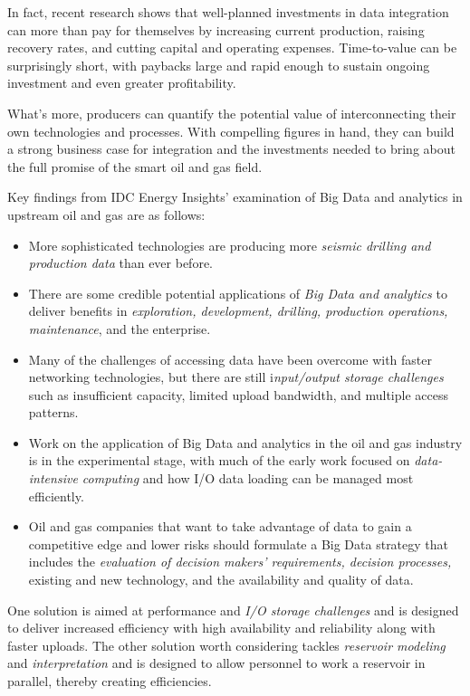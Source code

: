 \documentclass[twocolumn]{article}
\newcommand{\bi}{\begin{itemize}}
\newcommand{\ei}{\end{itemize}}
\newcommand{\ii}{\item}
\begin{document}
In fact, recent research shows that well-planned investments in data integration can more than pay for themselves by increasing current production, raising recovery rates, and cutting capital and operating expenses. Time-to-value can be surprisingly short, with paybacks large and rapid enough to sustain ongoing investment and even greater profitability.

What’s more, producers can quantify the potential value
of interconnecting their own technologies and processes. With compelling figures in hand, they can build a strong business case for integration and the investments needed to bring about the full promise of the smart oil and gas field.

Key findings from IDC Energy Insights' examination of Big Data and analytics in upstream oil and gas are as follows:
\bi
\ii More sophisticated technologies are producing more \emph{seismic drilling and production data} than ever before.
\ii There are some credible potential applications of \emph{Big Data and analytics }to deliver benefits in \emph{exploration, development, drilling, production operations, maintenance}, and the enterprise.
\ii Many of the challenges of accessing data have been overcome with faster networking technologies, but there are still i\emph{nput/output storage challenges} such as insufficient capacity, limited upload bandwidth, and multiple access patterns.
\ii Work on the application of Big Data and analytics in the oil and gas industry is in the experimental stage, with much of the early work focused on \emph{data-intensive computing} and how I/O data loading can be managed most efficiently.
\ii Oil and gas companies that want to take advantage of data to gain a competitive edge and lower risks should formulate a Big Data strategy that includes the \emph{evaluation of decision makers' requirements, decision processes,} existing and new technology, and the availability and quality of data.
\ei

One solution is aimed at performance and \emph{I/O storage challenges} and is designed to deliver increased efficiency with high availability and reliability along with faster uploads. The other solution worth considering tackles \emph{reservoir modeling} and \emph{interpretation} and is designed to allow personnel to work a reservoir in parallel, thereby creating efficiencies.

\end{document}
